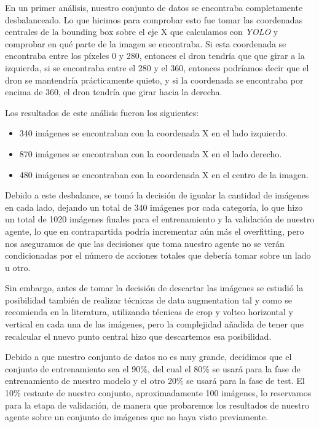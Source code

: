En un primer análisis, nuestro conjunto de datos se encontraba completamente desbalanceado. Lo que hicimos para comprobar esto fue tomar las coordenadas centrales de la bounding box sobre el eje X que calculamos con \textit{YOLO} y comprobar en qué parte de la imagen se encontraba. Si esta coordenada se encontraba entre los píxeles 0 y 280, entonces el dron tendría que que girar a la izquierda, si se encontraba entre el 280 y el 360, entonces podríamos decir que el dron se mantendría prácticamente quieto, y si la coordenada se encontraba por encima de 360, el dron tendría que girar hacia la derecha.
\medskip

Los resultados de este análisis fueron los siguientes:

\begin{itemize}
    \item 340 imágenes se encontraban con la coordenada X en el lado izquierdo.
    \item 870 imágenes se encontraban con la coordenada X en el lado derecho.
    \item 480 imágenes se encontraban con la coordenada X en el centro de la imagen.
\end{itemize}

Debido a este desbalance, se tomó la decisión de igualar la cantidad de imágenes en cada lado, dejando un total de 340 imágenes por cada categoría, lo que hizo un total de 1020 imágenes finales para el entrenamiento y la validación de nuestro agente, lo que en contrapartida podría incrementar aún más el overfitting, pero nos aseguramos de que las decisiones que toma nuestro agente no se verán condicionadas por el número de acciones totales que debería tomar sobre un lado u otro. 
\medskip

Sin embargo, antes de tomar la decisión de descartar las imágenes se estudió la posibilidad también de realizar técnicas de data augmentation tal y como se recomienda en la literatura, utilizando técnicas de crop y volteo horizontal y vertical en cada una de las imágenes, pero la complejidad añadida de tener que recalcular el nuevo punto central hizo que descartemos esa posibilidad.
\medskip

Debido a que nuestro conjunto de datos no es muy grande, decidimos que el conjunto de entrenamiento sea el 90\%, del cual el 80\% se usará para la fase de entrenamiento de nuestro modelo y el otro 20\% se usará para la fase de test. El 10\% restante de nuestro conjunto, aproximadamente 100 imágenes, lo reservamos para la etapa de validación, de manera que probaremos los resultados de nuestro agente sobre un conjunto de imágenes que no haya visto previamente.


